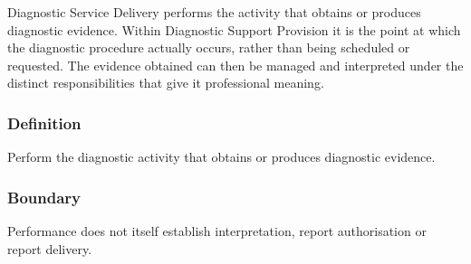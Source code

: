 Diagnostic Service Delivery performs the activity that obtains or produces diagnostic evidence. Within Diagnostic Support Provision it is the point at which the diagnostic procedure actually occurs, rather than being scheduled or requested. The evidence obtained can then be managed and interpreted under the distinct responsibilities that give it professional meaning.

\subsubsection*{Definition}

Perform the diagnostic activity that obtains or produces diagnostic evidence.

\subsubsection*{Boundary}

Performance does not itself establish interpretation, report authorisation or report delivery.

